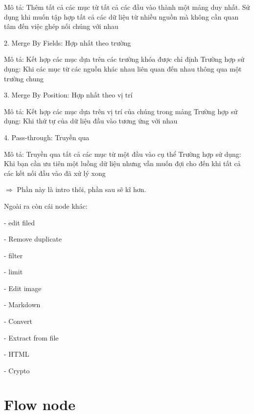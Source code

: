 Mô tả: Thêm tất cả các mục từ tất cả các đầu vào thành một mảng duy nhất. Sử dụng khi muốn tập hợp tất cả các dữ liệu từ nhiều nguồn mà không cần quan tâm đến việc ghép nối chúng với nhau

2. Merge By Fields: Hợp nhất theo trường

Mô tả: Kết hợp các mục dựa trên các trường khóa được chỉ định
Trường hợp sử dụng: Khi các mục từ các nguồn khác nhau liên quan đến nhau thông qua một trường chung

3. Merge By Position: Hợp nhất theo vị trí

Mô tả: Kết hợp các mục dựa trên vị trí của chúng trong mảng
Trường hợp sử dụng: Khi thứ tự của dữ liệu đầu vào tương ứng với nhau

4. Pass-through: Truyền qua

Mô tả: Truyền qua tất cả các mục từ một đầu vào cụ thể
Trường hợp sử dụng: Khi bạn cần ưu tiên một luồng dữ liệu nhưng vẫn muốn đợi cho đến khi tất cả các kết nối đầu vào đã xử lý xong

$\Rightarrow$ Phần này là intro thôi, phần sau sẽ kĩ hơn.


Ngoài ra còn cái node khác:


- edit filed

- Remove duplicate

- filter

- limit

- Edit image

- Markdown

- Convert

- Extract from file

- HTML


- Crypto

\section{Flow node}

